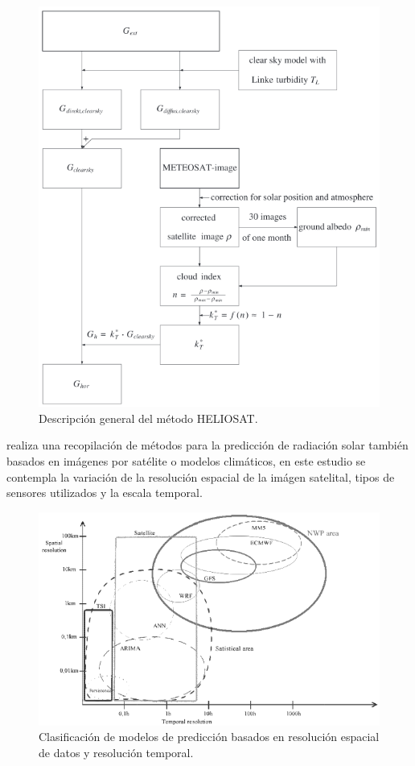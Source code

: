 \begin{figure}[htb]
  \centering 
  \includegraphics[scale=0.5]{pictures/ER2.png}
  \caption{Descripción general del método HELIOSAT.} 
  \label{fig:er2}
\end{figure}
\newpage
\cite{diagne2012solarirradiation} realiza una recopilación de métodos para la predicción de radiación solar también basados en imágenes por satélite o modelos climáticos, en este estudio 
se contempla la variación de la resolución espacial de la imágen satelital, tipos de sensores utilizados y la escala temporal.
\begin{figure}[htb]
  \centering 
  \includegraphics[scale=0.65]{pictures/ER3.png}
  \caption{Clasificación de modelos de predicción basados en resolución espacial de datos y resolución temporal.} 
  \label{fig:er3}
\end{figure}

